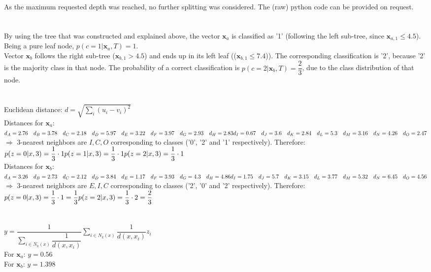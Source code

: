 \documentclass[11pt]{article}
\newcommand{\exercise}{\section{}}
\begin{document}
 As the maximum requested depth was reached, no further splitting was considered. The (raw) python code can be provided on request.
 
\exercise
By using the tree that was constructed and explained above, the vector $\mathbf{x}_a$ is classified as '1' (following the left sub-tree, since $\mathbf{x}_{a,1} \le 4.5$). Being a pure leaf node, $p(c=1|\mathbf{x}_a,T) = 1$.\\

Vector $\mathbf{x}_b$ follows the right sub-tree ($\mathbf{x}_{b,1} > 4.5$) and ends up in its left leaf (($\mathbf{x}_{b,1} \le 7.4$)). The corresponding classification is '2', because '2' is the majority class in that node. The probability of a correct classification is $p(c=2|\mathbf{x}_b,T) = \dfrac{2}{3}$, due to the class distribution of that node.

\exercise


\exercise
Euclidean distance: $d = \sqrt{\sum_i(u_i - v_i)^2}$\\
Distances for $\mathbf{x}_a$:\\
$d_A=2.76 \quad d_B = 3.78 \quad d_C=2.18 \quad d_D=5.97 \quad d_E = 3.22 \quad d_F = 3.97 \quad d_G = 2.93 \quad d_H = 2.83 \\
d_I=0.67 \quad d_J=3.6 \quad d_K=2.84 \quad d_L=5.3 \quad d_M = 3.16 \quad d_N = 4.26 \quad d_O = 2.47$\\
$\Rightarrow$ 3-nearest neighbors are $I, C, O$ corresponding to classes ('0', '2' and '1' respectively). Therefore:\\
$p(z=0|x, 3) = \dfrac{1}{3} \cdot 1\\
p(z=1|x, 3) = \dfrac{1}{3} \cdot 1\\
p(z=2|x, 3) = \dfrac{1}{3} \cdot 1$\\

Distances for $\mathbf{x}_b$:\\
$d_A=3.26 \quad d_B = 2.73 \quad d_C=2.12 \quad d_D=3.84 \quad d_E = 1.17 \quad d_F = 3.93 \quad d_G = 4.3 \quad d_H = 4.86 \\
d_I=1.75 \quad d_J=5.7 \quad d_K=3.15 \quad d_L=3.77 \quad d_M = 5.32 \quad d_N = 6.45 \quad d_O = 4.56$\\
$\Rightarrow$ 3-nearest neighbors are $E, I, C$ corresponding to classes ('2', '0' and '2' respectively). Therefore:\\
$p(z=0|x, 3) = \dfrac{1}{3} \cdot 1 = \dfrac{1}{3}\\
p(z=2|x, 3) = \dfrac{1}{3} \cdot 2 = \dfrac{2}{3}$

\exercise
$y = \dfrac{1}{\sum_{i\in N_k(x)}\dfrac{1}{d(x,x_i)}} \sum_{i\in N_k(x)}\dfrac{1}{d(x,x_i)} z_i$\\

For $\mathbf{x}_a$:
$y=0.56$\\
For $\mathbf{x}_b$:
$y=1.398$
\end{document}
